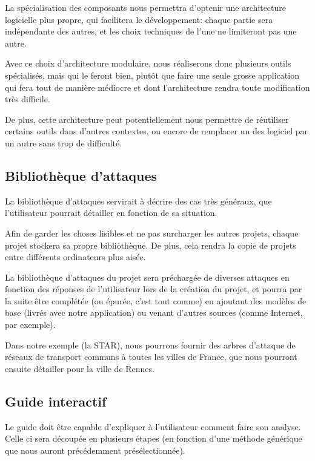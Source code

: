         La spécialisation des composants nous permettra d'optenir une architecture logicielle plus propre, qui facilitera le développement: chaque partie sera indépendante des autres, et les choix techniques de l'une ne limiteront pas une autre.

        Avec ce choix d'architecture modulaire, nous réaliserons donc plusieurs outils spécialisés, mais qui le feront bien, plutôt que faire une seule grosse application qui fera tout de manière médiocre et dont l'architecture rendra toute modification très difficile.
        
        De plus, cette architecture peut potentiellement nous permettre de réutiliser certains outils dans d'autres contextes, ou encore de remplacer un des logiciel par un autre sans trop de difficulté. 
    
    \subsection{Bibliothèque d'attaques}  
        \label{subsec:biblio_atk}
        La bibliothèque d'attaques servirait à décrire des cas très généraux, que l'utilisateur pourrait détailler en fonction de sa situation. 
        
        Afin de garder les choses lisibles et ne pas surcharger les autres projets, chaque projet stockera sa propre bibliothèque. De plus, cela rendra la copie de projets entre différents ordinateurs plus aisée.
        
        La bibliothèque d'attaques du projet sera préchargée de diverses attaques en fonction des réponses de l'utilisateur lors de la création du projet, et pourra par la suite être complétée (ou épurée, c'est tout comme) en ajoutant des modèles de base (livrés avec notre application) ou venant d'autres sources (comme Internet, par exemple).
        
        Dans notre exemple (la STAR), nous pourrons fournir des arbres d'attaque de réseaux de transport communs à toutes les villes de France, que nous pourront ensuite détailler pour la ville de Rennes.
      
    \subsection{Guide interactif}
        \label{subsec:guide_inter}
        Le guide doit être capable d'expliquer à l'utilisateur comment faire son analyse. Celle ci sera découpée en plusieurs étapes (en fonction d'une méthode générique que nous auront précédemment présélectionnée).

